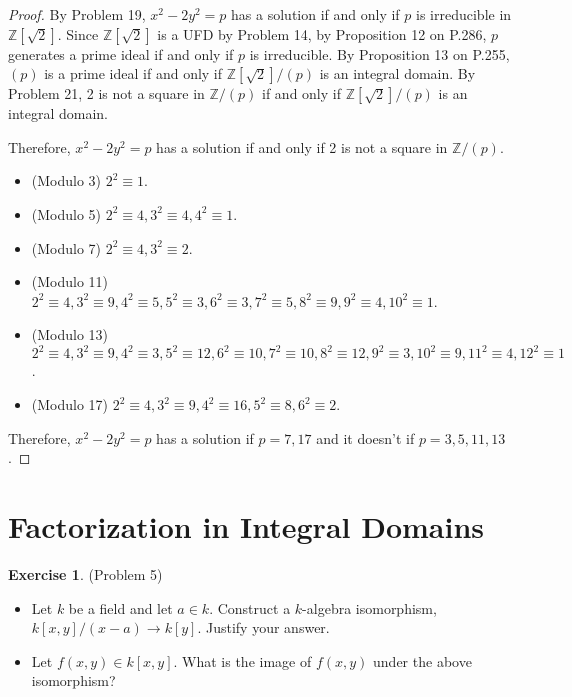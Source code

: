 \documentclass[12pt, psamsfonts]{amsart}
\theoremstyle{definition}
\newtheorem*{exer}{Exercise}
\theoremstyle{remark}
\numberwithin{equation}{section}
\begin{document}
\begin{proof}
  By Problem 19, $x^2 - 2y^2 = p$ has a solution if and only if $p$ is irreducible in $\mathbb{Z}[\sqrt{2}]$.
  Since $\mathbb{Z}[\sqrt{2}]$ is a UFD by Problem 14, by Proposition 12 on P.286, $p$ generates a prime ideal if and only if $p$ is irreducible.
  By Proposition 13 on P.255, $(p)$ is a prime ideal if and only if $\mathbb{Z}[\sqrt{2}]/(p)$ is an integral domain.
  By Problem 21, 2 is not a square in $\mathbb{Z}/(p)$ if and only if $\mathbb{Z}[\sqrt{2}]/(p)$ is an integral domain.

  Therefore, $x^2 - 2y^2 = p$ has a solution if and only if 2 is not a square in $\mathbb{Z}/(p)$.

  \begin{itemize}
    \item (Modulo 3)
      $2^2 \equiv 1$.
    \item (Modulo 5)
      $2^2 \equiv 4, 3^2 \equiv 4, 4^2 \equiv 1$.
    \item (Modulo 7)
      $2^2 \equiv 4, 3^2 \equiv 2$.
    \item (Modulo 11)
      $2^2 \equiv 4, 3^2 \equiv 9, 4^2 \equiv 5, 5^2 \equiv 3, 6^2 \equiv 3, 7^2 \equiv 5, 8^2 \equiv 9, 9^2 \equiv 4, 10^2 \equiv 1$.
    \item (Modulo 13)
      $2^2 \equiv 4, 3^2 \equiv 9, 4^2 \equiv 3, 5^2 \equiv 12, 6^2 \equiv 10, 7^2 \equiv 10, 8^2 \equiv 12, 9^2 \equiv 3, 10^2 \equiv 9, 11^2 \equiv 4, 12^2 \equiv 1$.
    \item (Modulo 17)
      $2^2 \equiv 4, 3^2 \equiv 9, 4^2 \equiv 16, 5^2 \equiv 8, 6^2 \equiv 2$.
  \end{itemize}

  Therefore, $x^2 - 2y^2 = p$ has a solution if $p = 7, 17$ and it doesn't if $p = 3, 5, 11, 13$.
\end{proof}

\section{Factorization in Integral Domains}

\begin{exer}{(Problem 5)}
  $ $
  \begin{itemize}
    \item
      Let $k$ be a field and let $a \in k$.
      Construct a $k$-algebra isomorphism, $k[x, y] / (x - a) \rightarrow k[y]$.
      Justify your answer.
    \item
      Let $f(x, y) \in k[x, y]$.
      What is the image of $f(x, y)$ under the above isomorphism?
  \end{itemize}
\end{exer}
\end{document}
